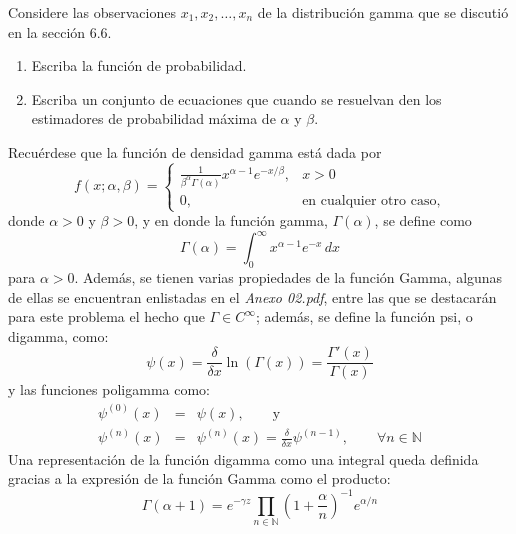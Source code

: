 \begin{enunciado}
 Considere las observaciones $x_1, x_2, \ldots, x_n$ de la distribuci\'on gamma que se discuti\'o en la secci\'on 6.6.
 \begin{enumerate}
  \item Escriba la funci\'on de probabilidad.
  \item Escriba un conjunto de ecuaciones que cuando se resuelvan den los estimadores de probabilidad m\'axima de $\alpha$ y $\beta$.
 \end{enumerate}
\end{enunciado}

\begin{solucion}
 Recu\'erdese que la funci\'on de densidad gamma est\'a dada por
 \begin{equation*}
  f(x; \alpha, \beta) =
  \begin{cases}
  \frac{1}{\beta^{\alpha} \Gamma(\alpha)} x^{\alpha-1} e^{-x/\beta} , & x > 0 \\
  0, & \text{en cualquier otro caso},
  \end{cases}
 \end{equation*}
 donde $\alpha > 0$ y $\beta > 0$, y en donde la funci\'on gamma, $\Gamma(\alpha)$, se define como
 \begin{equation*}
  \Gamma(\alpha) = \int_0^{\infty} x^{\alpha - 1} e^{-x} \, dx
 \end{equation*}
 para $\alpha > 0$. Adem\'as, se tienen varias propiedades de la funci\'on Gamma, algunas de ellas se encuentran enlistadas en el \textit{Anexo 02.pdf}, entre las que se destacar\'an para este problema el hecho que $\Gamma \in C^{\infty}$; adem\'as, se define la funci\'on psi, o digamma, como:
 \begin{equation*}
  \psi(x) = \frac{\delta}{\delta x} \ln\left( \Gamma(x) \right) = \frac{\Gamma'(x)}{\Gamma(x)}
 \end{equation*}
 y las funciones poligamma como:
 \begin{eqnarray*}
  \psi^{(0)}(x) & = & \psi(x), \qquad \text{y} \\
  \psi^{(n)}(x) & = & \psi^{(n)}(x) = \frac{\delta}{\delta x} \psi^{(n-1)}, \qquad \forall n \in \mathbb{N}
 \end{eqnarray*}
 Una representaci\'on de la funci\'on digamma como una integral queda definida gracias a la expresi\'on de la funci\'on Gamma como el producto:
 \begin{equation*}
  \Gamma(\alpha+1) = e^{-\gamma z} \prod_{n\in\mathbb{N}} \left( 1 + \frac{\alpha}{n} \right)^{-1} e^{\alpha/n}

\end{equation*}
\end{solucion}
